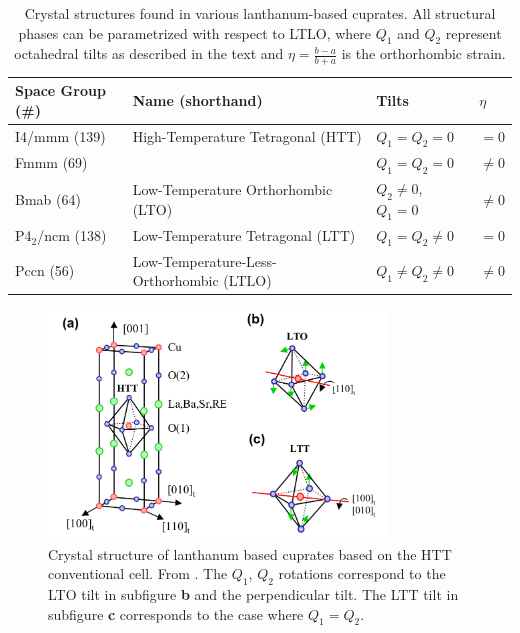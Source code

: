 \begin{table}
	\caption[Crystal structures LSCO]{Crystal structures found in various lanthanum-based cuprates. All structural phases can be parametrized with respect to LTLO, where $Q_1$ and $Q_2$ represent octahedral tilts as described in the text and $\eta=\frac{b-a}{b+a}$ is the orthorhombic strain.}
	\label{tab:crystalstructures}
	\centering
	\begin{tabular}{@{}llll@{}}
		\toprule
		Space Group (\#) & Name (shorthand)                         & Tilts                                    & $\eta$   \\ \midrule
		I4/mmm (139)     & High-Temperature Tetragonal (HTT)        & $Q_1=Q_2=0$                              & $=0$     \\
		Fmmm (69)        &                                          & $Q_1=Q_2=0$                              & $\neq 0$ \\
		Bmab (64)        & Low-Temperature Orthorhombic (LTO)       & $Q_2 \neq 0$, $Q_1 = 0$                  & $\neq 0$ \\
		P4$_2$/ncm (138) & Low-Temperature Tetragonal (LTT)         & $Q_1=Q_2 \neq 0$                         & $=0$     \\
		Pccn (56)        & Low-Temperature-Less-Orthorhombic (LTLO) & $Q_1 \neq Q_2 \neq 0$ & $\neq 0$ \\ \bottomrule
	\end{tabular}
\end{table}

\begin{figure}
	\centering
	\includegraphics[width=0.8\textwidth]{fig/simulation/crystal_hucker.png}
	\caption[LSCO crystal]{Crystal structure of lanthanum based cuprates based on the HTT conventional cell. From \cite{Hucker2012}. The $Q_1$, $Q_2$ rotations correspond to the LTO tilt in subfigure \textbf{b} and the perpendicular tilt. The LTT tilt in subfigure \textbf{c} corresponds to the case where $Q_1 = Q_2$.}
	\label{fig:lscocrystal}
\end{figure}

